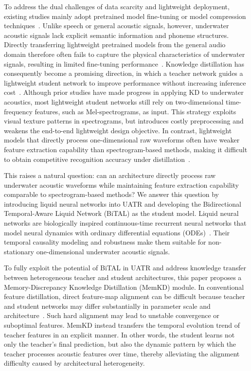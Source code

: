 ﻿\documentclass[lettersize,journal]{IEEEtran}
\begin{document}
To address the dual challenges of data scarcity and lightweight deployment, existing studies mainly adopt pretrained model fine-tuning or model compression techniques~\cite{Kong2020PANNs,Gou2021KDSurvey}. Unlike speech or general acoustic signals, however, underwater acoustic signals lack explicit semantic information and phoneme structures. Directly transferring lightweight pretrained models from the general audio domain therefore often fails to capture the physical characteristics of underwater signals, resulting in limited fine-tuning performance~\cite{Baevski2020Wav2Vec2,Kong2020PANNs,Urick1983,Jensen2011,Medwin2005}. Knowledge distillation has consequently become a promising direction, in which a teacher network guides a lightweight student network to improve performance without increasing inference cost~\cite{Bucila2006Compression,Hinton2015Distilling,Romero2015FitNets}. Although prior studies have made progress in applying KD to underwater acoustics, most lightweight student networks still rely on two-dimensional time-frequency features, such as Mel-spectrograms, as input. This strategy exploits visual texture patterns in spectrograms, but introduces costly preprocessing and weakens the end-to-end lightweight design objective. In contrast, lightweight models that directly process one-dimensional raw waveforms often have weaker feature extraction capability than spectrogram-based methods, making it difficult to obtain competitive recognition accuracy under distillation~\cite{Oord2016WaveNet,Bai2018TCN}.

This raises a natural question: can an architecture directly process raw underwater acoustic waveforms while maintaining feature extraction capability comparable to spectrogram-based methods? We answer this question by introducing liquid neural networks into UATR and developing the Bidirectional Temporal-Aware Liquid Network (BiTAL) as the student model. Liquid neural networks are biologically inspired continuous-time recurrent neural networks that model neural dynamics with ordinary differential equations (ODEs)~\cite{Chen2018NeuralODE,Hasani2021LTC,Hasani2022CfC}. Their temporal causality modeling and robustness make them suitable for non-stationary one-dimensional underwater acoustic signals.

To fully exploit the potential of BiTAL in UATR and address knowledge transfer between heterogeneous teacher and student architectures, this paper proposes a Memory-Discrepancy Knowledge Distillation (MemKD) module. In conventional feature distillation, direct feature-map alignment can be difficult because teacher and student networks may differ substantially in parameter scale and architecture~\cite{Yim2017FSP,Zagoruyko2017AT,Ahn2019VID}. Such hard alignment may lead to unstable convergence or suboptimal features. MemKD instead transfers the temporal evolution trend of teacher features in an explicit manner. In other words, the student learns not only the teacher's final prediction, but also the dynamic pattern by which the teacher processes acoustic features over time, thereby alleviating the alignment difficulty caused by architectural heterogeneity.
\end{document}
